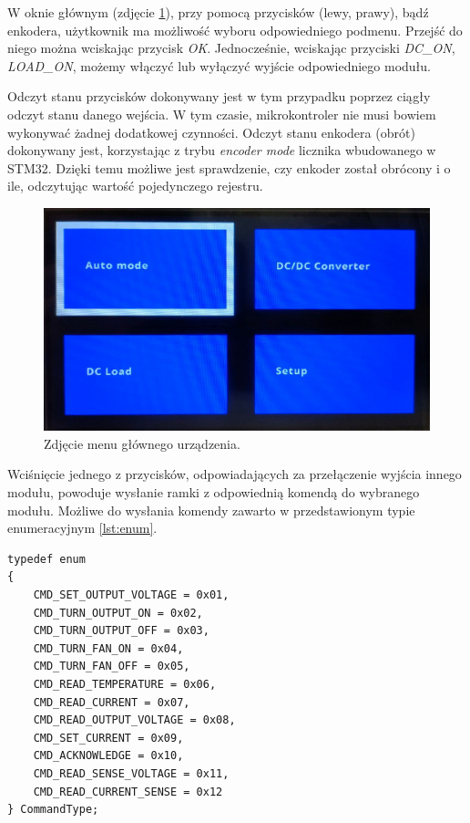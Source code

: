 W oknie głównym (zdjęcie \ref{fig:main_menu_zdjecie}), przy pomocą przycisków (lewy, prawy), bądź enkodera,
użytkownik ma możliwość wyboru odpowiedniego podmenu. Przejść do niego można wciskając przycisk \textit{OK}.
Jednocześnie, wciskając przyciski \textit{DC\_ON}, \textit{LOAD\_ON}, możemy włączyć lub wyłączyć wyjście odpowiedniego modułu.

Odczyt stanu przycisków dokonywany jest w tym przypadku poprzez ciągły odczyt stanu danego wejścia. 
W tym czasie, mikrokontroler nie musi bowiem wykonywać żadnej dodatkowej czynności. Odczyt stanu enkodera 
(obrót) dokonywany jest, korzystając z trybu \textit{encoder mode} licznika wbudowanego w STM32.
Dzięki temu możliwe jest sprawdzenie, czy enkoder został obrócony i o ile, odczytując wartość pojedynczego rejestru.

\begin{figure}[h!]
    \begin{center}
        \includegraphics[width = 13cm]{images/main_menu_zdjece.jpg}
        \caption{Zdjęcie menu głównego urządzenia.} 
        \label{fig:main_menu_zdjecie}
    \end{center}
\end{figure}

Wciśnięcie jednego z przycisków, odpowiadających za przełączenie wyjścia innego modułu, powoduje wysłanie ramki z odpowiednią komendą do wybranego modułu.
Możliwe do wysłania komendy zawarto w przedstawionym typie enumeracyjnym \ref{lst:enum}.

\begin{lstlisting}[label=lst:enum,caption=Lista dostępnych komend przesyłanych poprzez RS485., float,frame=tb]
typedef enum
{
    CMD_SET_OUTPUT_VOLTAGE = 0x01,
    CMD_TURN_OUTPUT_ON = 0x02,
    CMD_TURN_OUTPUT_OFF = 0x03,
    CMD_TURN_FAN_ON = 0x04,
    CMD_TURN_FAN_OFF = 0x05,
    CMD_READ_TEMPERATURE = 0x06,
    CMD_READ_CURRENT = 0x07,
    CMD_READ_OUTPUT_VOLTAGE = 0x08,
    CMD_SET_CURRENT = 0x09,
    CMD_ACKNOWLEDGE = 0x10,
    CMD_READ_SENSE_VOLTAGE = 0x11,
    CMD_READ_CURRENT_SENSE = 0x12
} CommandType;
\end{lstlisting}

